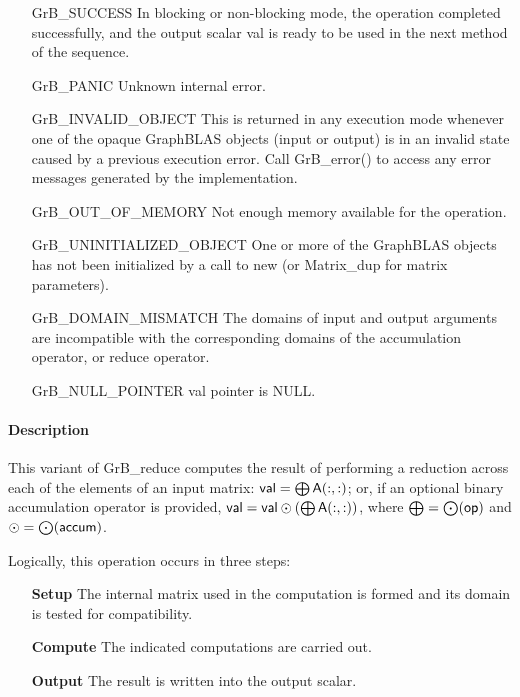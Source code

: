 \begin{itemize}[leftmargin=2.1in]
    \item[{\sf GrB\_SUCCESS}]         In blocking or non-blocking mode, 
    the operation completed successfully, and the
    output scalar {\sf val} is ready to be used in the next method of 
    the sequence.

    \item[{\sf GrB\_PANIC}]           Unknown internal error.

    \item[{\sf GrB\_INVALID\_OBJECT}] This is returned in any execution mode 
    whenever one of the opaque GraphBLAS objects (input or output) is in an invalid 
    state caused by a previous execution error.  Call {\sf GrB\_error()} to access 
    any error messages generated by the implementation.

    \item[{\sf GrB\_OUT\_OF\_MEMORY}] Not enough memory available for the operation.

    \item[{\sf GrB\_UNINITIALIZED\_OBJECT}] One or more of the GraphBLAS objects 
    has not been initialized by a call to {\sf new} (or {\sf Matrix\_dup} for matrix
    parameters).
    
    \item[{\sf GrB\_DOMAIN\_MISMATCH}]    The domains of input and output arguments are
    incompatible with the corresponding domains of the accumulation operator, 
    or reduce operator.

    \item[{\sf GrB\_NULL\_POINTER}]  {\sf val} pointer is {\sf NULL}.
\end{itemize}

\paragraph{Description}

This variant of {\sf GrB\_reduce} computes the result of performing
a reduction across each of the elements of an input matrix:
${\sf val} = \bigoplus {\sf A}(:,:)$; or, if an optional binary accumulation 
operator is provided, ${\sf val} = {\sf val} \odot (\bigoplus {\sf A}(:,:))$, 
where $\bigoplus = \bigodot({\sf op})$ and $\odot = \bigodot({\sf accum})$.  

Logically, this operation occurs in three steps:
\begin{enumerate}[leftmargin=0.85in]
\item[\bf Setup] The internal matrix used in the computation is formed 
and its domain is tested for compatibility.
\item[\bf Compute] The indicated computations are carried out.
\item[\bf Output] The result is written into the output scalar.
\end{enumerate}

